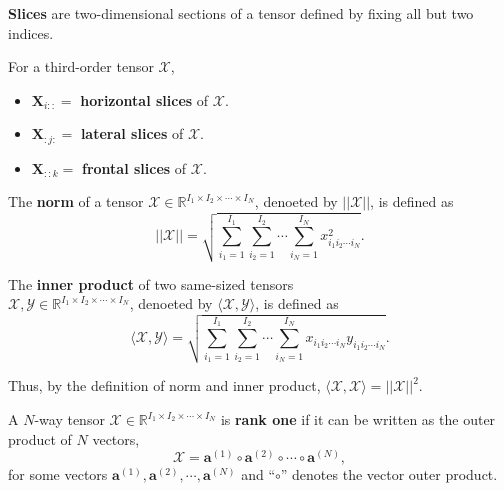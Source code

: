 \documentclass[preprint]{elsarticle}
\begin{document}
\begin{defn}
    \textbf{Slices} are two-dimensional sections of a tensor defined by fixing all but two indices.
\end{defn}
For a third-order tensor $\boldsymbol{\mathscr{X}}$,
\begin{itemize}
    \item $\mathbf{X}_{i::}=$ \textbf{horizontal slices} of $\boldsymbol{\mathscr{X}}$.
    \item $\mathbf{X}_{:j:}=$ \textbf{lateral slices} of $\boldsymbol{\mathscr{X}}$.
    \item $\mathbf{X}_{::k}=$ \textbf{frontal slices} of $\boldsymbol{\mathscr{X}}$.
\end{itemize}
\begin{defn}
    The \textbf{norm} of a tensor $\boldsymbol{\mathscr{X}}\in\mathbb{R}^{I_1\times I_2\times\cdots\times I_N}$,
    denoeted by $||\boldsymbol{\mathscr{X}}||$, is defined as
    \begin{equation}
        ||\boldsymbol{\mathscr{X}}||=\sqrt{\sum_{i_1=1}^{I_1}\sum_{i_2=1}^{I_2}\cdots\sum_{i_N=1}^{I_N}x_{i_1i_2\cdots i_N}^2}.
    \end{equation}
\end{defn}
\begin{defn}
    The \textbf{inner product} of two same-sized tensors\\
    $\boldsymbol{\mathscr{X}},\boldsymbol{\mathscr{Y}}\in\mathbb{R}^{I_1\times I_2\times\cdots\times I_N}$,
    denoeted by $\langle\boldsymbol{\mathscr{X}},\boldsymbol{\mathscr{Y}}\rangle$, is defined as
    \begin{equation}
        \langle\boldsymbol{\mathscr{X}},\boldsymbol{\mathscr{Y}}\rangle=\sqrt{\sum_{i_1=1}^{I_1}\sum_{i_2=1}^{I_2}\cdots\sum_{i_N=1}^{I_N}x_{i_1i_2\cdots i_N}y_{i_1i_2\cdots i_N}}.
    \end{equation}
\end{defn}
Thus, by the definition of norm and inner product,
$\langle\boldsymbol{\mathscr{X}},\boldsymbol{\mathscr{X}}\rangle=||\boldsymbol{\mathscr{X}}||^2$.
\begin{defn}
    A $N$-way tensor $\boldsymbol{\mathscr{X}}\in\mathbb{R}^{I_1\times I_2\times\cdots\times I_N}$ is \textbf{rank one} if it can
    be written as the outer product of $N$ vectors,
    \begin{equation}
        \boldsymbol{\mathscr{X}} = \mathbf{a}^{(1)}\circ\mathbf{a}^{(2)}\circ\cdots\circ\mathbf{a}^{(N)},
    \end{equation}
    for some vectors $\mathbf{a}^{(1)},\mathbf{a}^{(2)},\cdots,\mathbf{a}^{(N)}$ and ``$\circ$'' denotes the vector outer product.
\end{defn}
\end{document}
